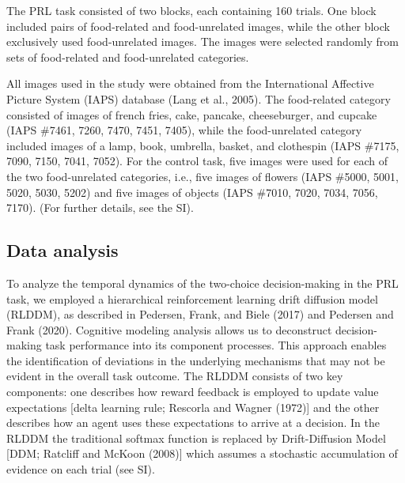 \documentclass[
  man,floatsintext]{apa6}
\begin{document}
The PRL task consisted of two blocks, each containing 160 trials. One block included pairs of food-related and food-unrelated images, while the other block exclusively used food-unrelated images. The images were selected randomly from sets of food-related and food-unrelated categories.

All images used in the study were obtained from the International Affective Picture System (IAPS) database (Lang et al., 2005). The food-related category consisted of images of french fries, cake, pancake, cheeseburger, and cupcake (IAPS \#7461, 7260, 7470, 7451, 7405), while the food-unrelated category included images of a lamp, book, umbrella, basket, and clothespin (IAPS \#7175, 7090, 7150, 7041, 7052). For the control task, five images were used for each of the two food-unrelated categories, i.e., five images of flowers (IAPS \#5000, 5001, 5020, 5030, 5202) and five images of objects (IAPS \#7010, 7020, 7034, 7056, 7170). (For further details, see the SI).

\hypertarget{data-analysis}{%
\subsection{Data analysis}\label{data-analysis}}

To analyze the temporal dynamics of the two-choice decision-making in the PRL task, we employed a hierarchical reinforcement learning drift diffusion model (RLDDM), as described in Pedersen, Frank, and Biele (2017) and Pedersen and Frank (2020). Cognitive modeling analysis allows us to deconstruct decision-making task performance into its component processes. This approach enables the identification of deviations in the underlying mechanisms that may not be evident in the overall task outcome. The RLDDM consists of two key components: one describes how reward feedback is employed to update value expectations {[}delta learning rule; Rescorla and Wagner (1972){]} and the other describes how an agent uses these expectations to arrive at a decision. In the RLDDM the traditional softmax function is replaced by Drift-Diffusion Model {[}DDM; Ratcliff and McKoon (2008){]} which assumes a stochastic accumulation of evidence on each trial (see SI).
\end{document}
